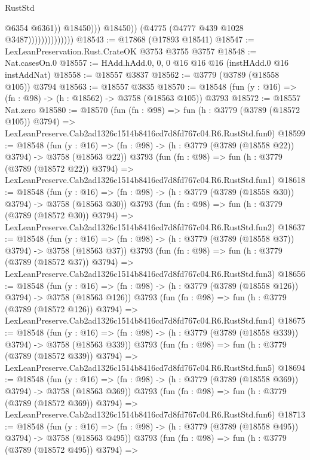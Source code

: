 \begin{lexlean}{RustStd}
\begin{coremodule}
                                          @6354
                                          @6361))
                                      @18450)))
                                @18450))
                            (@4775 (@4777 @439 @1028 @3487))))))))))))))
@18543 := @17868 (@17893 @18541)
@18547 := LexLeanPreservation.Rust.CrateOK @3753 @3755 @3757
@18548 := Nat.casesOn.{0}
@18557 := HAdd.hAdd.{0, 0, 0} @16 @16 @16 (instHAdd.{0} @16 instAddNat)
@18558 := @18557 @3837
@18562 := @3779 (@3789 (@18558 @105)) @3794
@18563 := @18557 @3835
@18570 := @18548 (fun (y : @16) => (fn : @98) -> (h : @18562) -> @3758 (@18563 @105)) @3793
@18572 := @18557 Nat.zero
@18580 := @18570
    (fun (fn : @98) =>
    fun (h : @3779 (@3789 (@18572 @105)) @3794) =>
    LexLeanPreserve.Cab2ad1326c1514b8416cd7d8fd767c04.R6.RustStd.fun0)
@18599 := @18548
    (fun (y : @16) => (fn : @98) -> (h : @3779 (@3789 (@18558 @22)) @3794) -> @3758 (@18563 @22))
    @3793
    (fun (fn : @98) =>
    fun (h : @3779 (@3789 (@18572 @22)) @3794) =>
    LexLeanPreserve.Cab2ad1326c1514b8416cd7d8fd767c04.R6.RustStd.fun1)
@18618 := @18548
    (fun (y : @16) => (fn : @98) -> (h : @3779 (@3789 (@18558 @30)) @3794) -> @3758 (@18563 @30))
    @3793
    (fun (fn : @98) =>
    fun (h : @3779 (@3789 (@18572 @30)) @3794) =>
    LexLeanPreserve.Cab2ad1326c1514b8416cd7d8fd767c04.R6.RustStd.fun2)
@18637 := @18548
    (fun (y : @16) => (fn : @98) -> (h : @3779 (@3789 (@18558 @37)) @3794) -> @3758 (@18563 @37))
    @3793
    (fun (fn : @98) =>
    fun (h : @3779 (@3789 (@18572 @37)) @3794) =>
    LexLeanPreserve.Cab2ad1326c1514b8416cd7d8fd767c04.R6.RustStd.fun3)
@18656 := @18548
    (fun (y : @16) => (fn : @98) -> (h : @3779 (@3789 (@18558 @126)) @3794) -> @3758 (@18563 @126))
    @3793
    (fun (fn : @98) =>
    fun (h : @3779 (@3789 (@18572 @126)) @3794) =>
    LexLeanPreserve.Cab2ad1326c1514b8416cd7d8fd767c04.R6.RustStd.fun4)
@18675 := @18548
    (fun (y : @16) => (fn : @98) -> (h : @3779 (@3789 (@18558 @339)) @3794) -> @3758 (@18563 @339))
    @3793
    (fun (fn : @98) =>
    fun (h : @3779 (@3789 (@18572 @339)) @3794) =>
    LexLeanPreserve.Cab2ad1326c1514b8416cd7d8fd767c04.R6.RustStd.fun5)
@18694 := @18548
    (fun (y : @16) => (fn : @98) -> (h : @3779 (@3789 (@18558 @369)) @3794) -> @3758 (@18563 @369))
    @3793
    (fun (fn : @98) =>
    fun (h : @3779 (@3789 (@18572 @369)) @3794) =>
    LexLeanPreserve.Cab2ad1326c1514b8416cd7d8fd767c04.R6.RustStd.fun6)
@18713 := @18548
    (fun (y : @16) => (fn : @98) -> (h : @3779 (@3789 (@18558 @495)) @3794) -> @3758 (@18563 @495))
    @3793
    (fun (fn : @98) =>
    fun (h : @3779 (@3789 (@18572 @495)) @3794) =>

\end{coremodule}
\end{lexlean}
